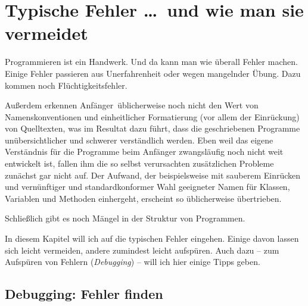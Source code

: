 \chapter{Typische Fehler \ldots\ und wie man sie vermeidet}
\renewcommand{\chaptertitle}{Typische Fehler \ldots\ und wie man sie vermeidet}

\lehead[]{\normalfont\sffamily\hspace*{-2.00cm}\textcolor{white}{\colorbox{lightblue}{\makebox[1.60cm][r]{\thechapter}}}\hspace{0.17cm}\textcolor{lightblue}{\chaptertitle}}
\rohead[]{\textcolor{lightblue}{\chaptertitle}\normalfont\sffamily\hspace*{0.17cm}\textcolor{white}{\colorbox{lightblue}{\makebox[1.60cm][l]{\thechapter}}}\hspace{-2.00cm}}
\rehead[]{\textcolor{lightblue}{AvHG, Inf, My}}
\lohead[]{\textcolor{lightblue}{AvHG, Inf, My}}

\lstset{style=myJava}

Programmieren ist ein Handwerk. Und da kann man wie überall Fehler machen.
Einige Fehler passieren aus Unerfahrenheit oder wegen mangelnder Übung. Dazu
kommen noch Flüchtigkeitsfehler.

Außerdem erkennen \glqq Anfänger\grqq\ üblicherweise noch nicht den Wert von
Namenskonventionen und einheitlicher Formatierung (vor allem der Einrückung) von
Quelltexten, was im Resultat dazu führt, dass die geschriebenen Programme
unübersichtlicher und schwerer verständlich werden. Eben weil das eigene
Verständnis für die Programme beim Anfänger zwangsläufig noch nicht weit
entwickelt ist, fallen ihm die so selbst verursachten zusätzlichen Probleme
zunächst gar nicht auf. Der Aufwand, der beispielsweise mit sauberem Einrücken
und vernünftiger und standardkonformer Wahl geeigneter Namen für Klassen,
Variablen und Methoden einhergeht, erscheint so üblicherweise übertrieben.

Schließlich gibt es noch Mängel in der Struktur von Programmen.

In diesem Kapitel will ich auf die typischen Fehler eingehen. Einige davon
lassen sich leicht vermeiden, andere zumindest leicht aufspüren. Auch dazu -- zum
Aufspüren von Fehlern (\emph{Debugging}) -- will ich hier einige Tipps geben.


\section{Debugging: Fehler finden}

